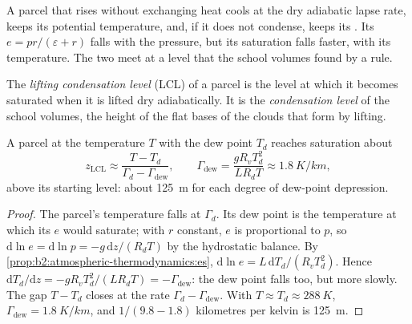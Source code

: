 A parcel that rises without exchanging heat cools at the dry adiabatic lapse rate, keeps its
potential temperature, and, if it does not condense, keeps its . Its 
$e = pr/(\varepsilon + r)$ falls with the pressure, but its saturation  falls
faster, with its temperature. The two meet at a level that the school volumes found by a rule.

\begin{definition}\label{def:b2:atmospheric-thermodynamics:lcl}
The \emph{lifting condensation level} (LCL) of a parcel is the
level at which it becomes saturated when it is lifted dry adiabatically. It is the
\emph{condensation level} of the school volumes, the height of the
flat bases of the clouds that form by lifting.
\end{definition}

\begin{proposition}\label{prop:b2:atmospheric-thermodynamics:lcl}
A parcel at the temperature $T$ with the dew point $T_d$ reaches saturation about
\[
  z_{\text{LCL}} \approx \frac{T - T_d}{\Gamma_d - \Gamma_{\text{dew}}}, \qquad
  \Gamma_{\text{dew}} = \frac{g R_v T_d^2}{L R_d T} \approx \qty{1.8}{K/km},
\]
above its starting level: about \qty{125}{m} for each degree of dew-point depression.
\end{proposition}

\begin{proof}
The parcel's temperature falls at $\Gamma_d$. Its dew point is the temperature at which its
 $e$ would saturate; with $r$ constant, $e$ is proportional to $p$, so
$\mathrm{d}\ln e = \mathrm{d}\ln p = -g\,\mathrm{d}z/(R_dT)$ by the hydrostatic balance. By
\cref{prop:b2:atmospheric-thermodynamics:es}, $\mathrm{d}\ln e = L\,\mathrm{d}T_d/(R_vT_d^2)$.
Hence $\mathrm{d}T_d/\mathrm{d}z = -gR_vT_d^2/(LR_dT) = -\Gamma_{\text{dew}}$: the dew point falls
too, but more slowly. The gap $T - T_d$ closes at the rate $\Gamma_d - \Gamma_{\text{dew}}$. With
$T \approx T_d \approx \qty{288}{K}$, $\Gamma_{\text{dew}} = \qty{1.8}{K/km}$, and $1/(9.8 - 1.8)$
kilometres per kelvin is \qty{125}{m}.
\end{proof}

